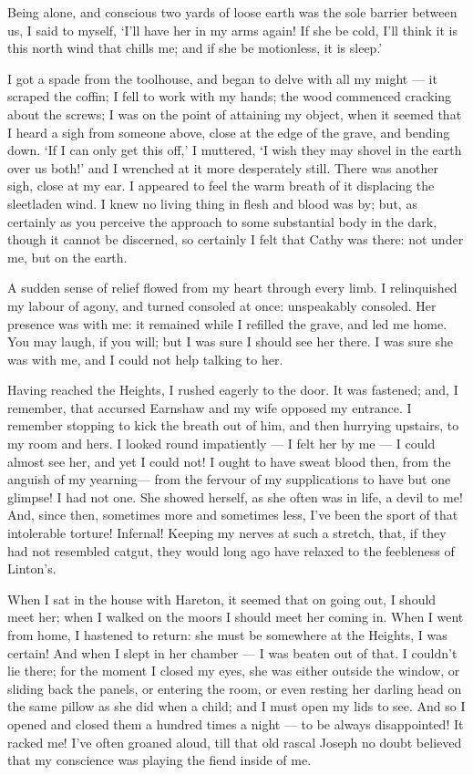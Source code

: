 \par Being alone, and conscious two yards of loose earth was the sole barrier between us, I said to myself, ‘I'll have her in my arms again! If she be cold, I'll think it is this north wind that chills me; and if she be motionless, it is sleep.’
\par I got a spade from the toolhouse, and began to delve with all my might — it scraped the coffin; I fell to work with my hands; the wood commenced cracking about the screws; I was on the point of attaining my object, when it seemed that I heard a sigh from someone above, close at the edge of the grave, and bending down. ‘If I can only get this off,’ I muttered, ‘I wish they may shovel in the earth over us both!’ and I wrenched at it more desperately still. There was another sigh, close at my ear. I appeared to feel the warm breath of it displacing the sleetladen wind. I knew no living thing in flesh and blood was by; but, as certainly as you perceive the approach to some substantial body in the dark, though it cannot be discerned, so certainly I felt that Cathy was there: not under me, but on the earth.
\par A sudden sense of relief flowed from my heart through every limb. I relinquished my labour of agony, and turned consoled at once: unspeakably consoled. Her presence was with me: it remained while I refilled the grave, and led me home. You may laugh, if you will; but I was sure I should see her there. I was sure she was with me, and I could not help talking to her.
\par Having reached the Heights, I rushed eagerly to the door. It was fastened; and, I remember, that accursed Earnshaw and my wife opposed my entrance. I remember stopping to kick the breath out of him, and then hurrying upstairs, to my room and hers. I looked round impatiently — I felt her by me — I could almost see her, and yet I could not! I ought to have sweat blood then, from the anguish of my yearning— from the fervour of my supplications to have but one glimpse! I had not one. She showed herself, as she often was in life, a devil to me! And, since then, sometimes more and sometimes less, I've been the sport of that intolerable torture! Infernal! Keeping my nerves at such a stretch, that, if they had not resembled catgut, they would long ago have relaxed to the feebleness of Linton's.
\par When I sat in the house with Hareton, it seemed that on going out, I should meet her; when I walked on the moors I should meet her coming in. When I went from home, I hastened to return: she must be somewhere at the Heights, I was certain! And when I slept in her chamber — I was beaten out of that. I couldn't lie there; for the moment I closed my eyes, she was either outside the window, or sliding back the panels, or entering the room, or even resting her darling head on the same pillow as she did when a child; and I must open my lids to see. And so I opened and closed them a hundred times a night — to be always disappointed! It racked me! I've often groaned aloud, till that old rascal Joseph no doubt believed that my conscience was playing the fiend inside of me.

